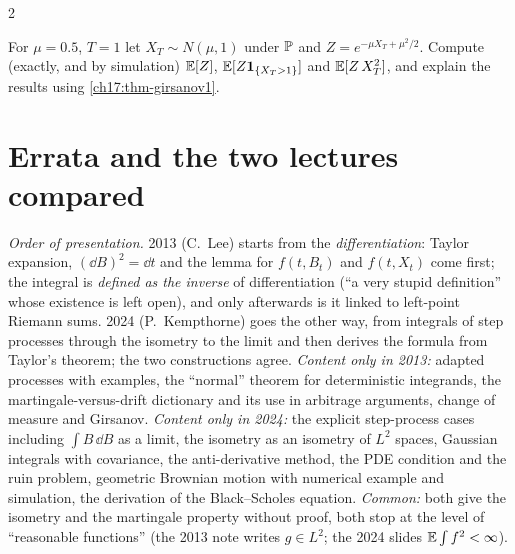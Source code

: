 \begin{paracol}{2}
\begin{exercise}\label{ch17:ex-x3}
For $\mu=0.5$, $T=1$ let $X_T\sim N(\mu,1)$ under $\mathbb{P}$ and $Z=e^{-\mu X_T+\mu^2/2}$. Compute (exactly, and by simulation) $\mathbb{E}[Z]$, $\mathbb{E}[Z\mathbf{1}_{\{X_T>1\}}]$ and $\mathbb{E}[Z\,X_T^2]$, and explain the results using \cref{ch17:thm-girsanov1}.
\end{exercise}

\section{Errata and the two lectures compared}\label{ch17:sec-compare}

\begin{coursenote}
\emph{Order of presentation.} 2013 (C.~Lee) starts from the \emph{differentiation}: Taylor expansion, $(\dd B)^2=\dd t$ and the lemma for $f(t,B_t)$ and $f(t,X_t)$ come first; the integral is \emph{defined as the inverse} of differentiation
(``a very stupid definition'' whose existence is left open), and only afterwards is it linked to left-point Riemann sums. 2024 (P.~Kempthorne) goes the other way, from integrals of step processes through the isometry to the limit and then derives the formula from Taylor's theorem; the two constructions agree.
\emph{Content only in 2013:} adapted processes with examples, the ``normal'' theorem for deterministic integrands, the martingale-versus-drift dictionary and its use in arbitrage arguments, change of measure and Girsanov. \emph{Content only in 2024:} the explicit step-process cases
including $\int B\,\dd B$ as a limit, the isometry as an isometry of $L^2$ spaces, Gaussian integrals with covariance, the anti-derivative method, the PDE condition and the ruin problem, geometric Brownian motion with numerical example and simulation, the derivation of the Black--Scholes equation.
\emph{Common:} both give the isometry and the martingale property without proof, both stop at the level of ``reasonable functions'' (the 2013 note writes $g\in L^2$; the 2024 slides $\mathbb{E}\int f^2<\infty$).
\end{coursenote}


\end{paracol}
